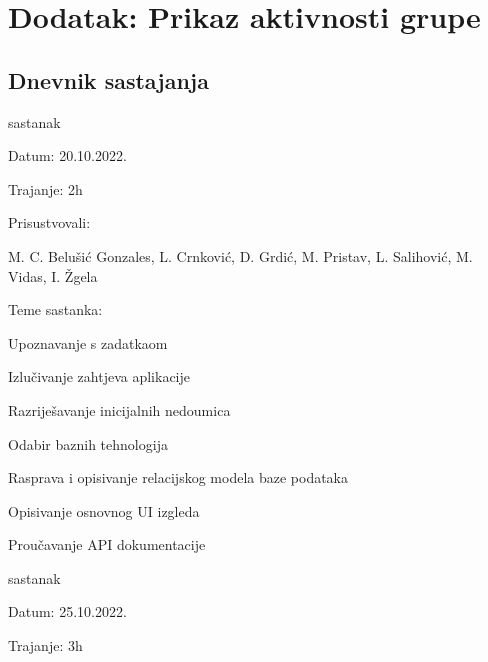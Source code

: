 \chapter*{Dodatak: Prikaz aktivnosti grupe}
		\section*{Dnevnik sastajanja}	
		\begin{packed_enum}
			\item  sastanak
			
			\item[] \begin{packed_item}
				\item Datum: 20.10.2022.
				\item Trajanje: 2h
			
			
				\item Prisustvovali: \begin{packed_enum}
				
				\item[]  M. C. Belušić Gonzales,
						 L. Crnković,
				  	     D. Grdić,
						 M. Pristav,
						 L. Salihović,
						 M. Vidas,
						 I. Žgela
				\end{packed_enum}
				\item Teme sastanka:
				\begin{packed_item}
					\item  Upoznavanje s zadatkaom
					\item  Izlučivanje zahtjeva aplikacije
					\item  Razriješavanje inicijalnih nedoumica
					\item  Odabir baznih tehnologija
					\item  Rasprava i opisivanje relacijskog modela baze podataka
					\item  Opisivanje osnovnog UI izgleda
					\item  Proučavanje API dokumentacije
				\end{packed_item}
			\end{packed_item}
		
		\item  sastanak
		
		\item[] \begin{packed_item}
			\item Datum: 25.10.2022.
			\item Trajanje: 3h
			

\end{packed_item}
\end{packed_enum}
